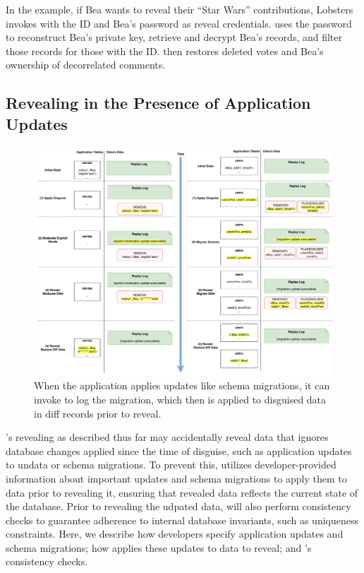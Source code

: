 %
In the example, if Bea wants to reveal their ``Star Wars'' contributions,
Lobsters invokes \sys with the \xx ID and Bea's password as reveal credentials.
%
\sys uses the password to reconstruct Bea's private key, retrieve and decrypt
Bea's records, and filter those records for those with the \xx ID.
%
\sys then restores deleted votes and Bea's ownership of
decorrelated comments.
%

\subsection{Revealing in the Presence of Application Updates}

\begin{figure}[h]
\centering
    \includegraphics[width=\textwidth]{figs/updates}
\caption{When the application applies updates like schema migrations, it can
    invoke \sys to log the migration, which then is applied to disguised data in
    diff records prior to reveal.}
\label{f:updates}
\end{figure}



\sys's revealing as described thus far may accidentally reveal data that ignores
database changes applied since the time of disguise, such as application updates
to un\xxed data or schema migrations.
%
To prevent this, \sys utilizes developer-provided information about important
updates and schema migrations to apply them to \xxed data prior to revealing it,
ensuring that revealed data reflects the current state of the database.
%
Prior to revealing the udpated data, \sys will also perform consistency checks
to guarantee adherence to internal database invariants, such as uniqueness
constraints.
%
Here, we describe how developers specify application updates and schema
migrations; how \sys applies these updates to data to reveal; and \sys's
consistency checks.

